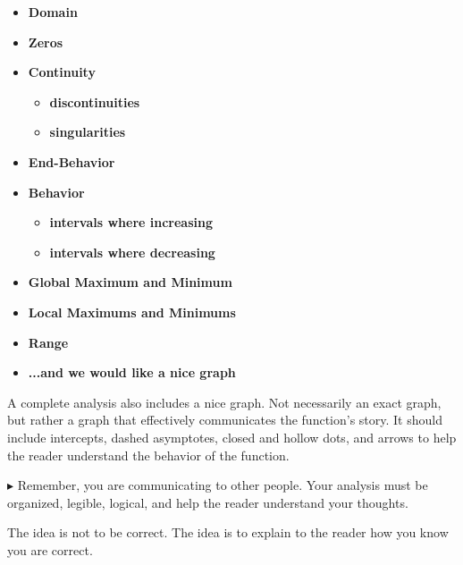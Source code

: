 \documentclass{ximera}
\begin{document}
\begin{itemize}
     \item \textbf{\textcolor{red!80!black}{Domain}} 
     \item \textbf{\textcolor{red!80!black}{Zeros}} 
     \item \textbf{\textcolor{red!80!black}{Continuity}} 
\begin{itemize}
     \item \textbf{\textcolor{purple!85!blue}{discontinuities}} 
     \item \textbf{\textcolor{purple!85!blue}{singularities}} 
\end{itemize}
     \item \textbf{\textcolor{red!80!black}{End-Behavior}} 
     \item \textbf{\textcolor{red!80!black}{Behavior}} 
\begin{itemize}
     \item \textbf{\textcolor{purple!85!blue}{intervals where increasing}} 
     \item \textbf{\textcolor{purple!85!blue}{intervals where decreasing}} 
\end{itemize}
     \item \textbf{\textcolor{red!80!black}{Global Maximum and Minimum}} 
     \item \textbf{\textcolor{red!80!black}{Local Maximums and Minimums}} 
     \item \textbf{\textcolor{red!80!black}{Range}} 
     \item \textbf{\textcolor{blue!55!black}{...and we would like a nice graph}} 
\end{itemize}




A complete analysis also includes a nice graph.  Not necessarily an exact graph, but rather a graph that effectively communicates the function's story. It should include intercepts, dashed asymptotes, closed and hollow dots, and arrows to help the reader understand the behavior of the function.  

\textbf{\textcolor{red!80!black}{$\blacktriangleright$}}  Remember, you are communicating to other people. Your analysis must be organized, legible, logical, and help the reader understand your thoughts.

The idea is not to be correct.  The idea is to explain to the reader how you know you are correct.
\end{document}
